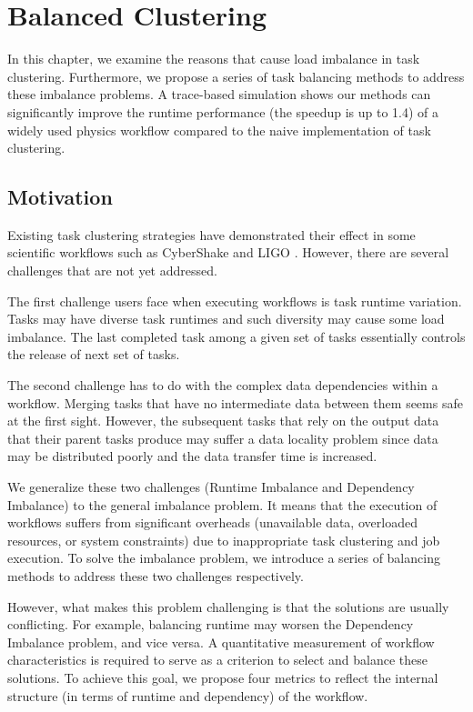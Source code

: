 \chapter{Balanced Clustering} 

In this chapter, we examine the reasons that cause load imbalance in task clustering. Furthermore, we propose a series of task balancing methods to address these imbalance problems. A trace-based simulation shows our methods can significantly improve the runtime performance (the speedup is up to 1.4) of a widely used physics workflow compared to the naive implementation of task clustering.

\section{Motivation}


Existing task clustering strategies have demonstrated their effect in some scientific workflows such as CyberShake \cite{Rynge2012} and LIGO \cite{Deelman2002}. However, there are several challenges that are not yet addressed. 

The first challenge users face when executing workflows is task runtime variation. Tasks may have diverse task runtimes and such diversity may cause some load imbalance. The last completed task among a given set of tasks essentially controls the release of next set of tasks. 

The second challenge has to do with the complex data dependencies within a workflow. Merging tasks that have no intermediate data between them seems safe at the first sight. However, the subsequent tasks that rely on the output data that their parent tasks produce may suffer a data locality problem since data may be distributed poorly and the data transfer time is increased. 

We generalize these two challenges (Runtime Imbalance and Dependency Imbalance) to the general imbalance problem. It means that the execution of workflows suffers from significant overheads (unavailable data, overloaded resources, or system constraints) due to inappropriate task clustering and job execution. To solve the imbalance problem, we introduce a series of balancing methods to address these two challenges respectively. 

However, what makes this problem challenging is that the solutions are usually conflicting. For example, balancing runtime may worsen the Dependency Imbalance problem, and vice versa. A quantitative measurement of workflow characteristics is required to serve as a criterion to select and balance these solutions. To achieve this goal, we propose four metrics to reflect the internal structure (in terms of runtime and dependency) of the workflow. 

